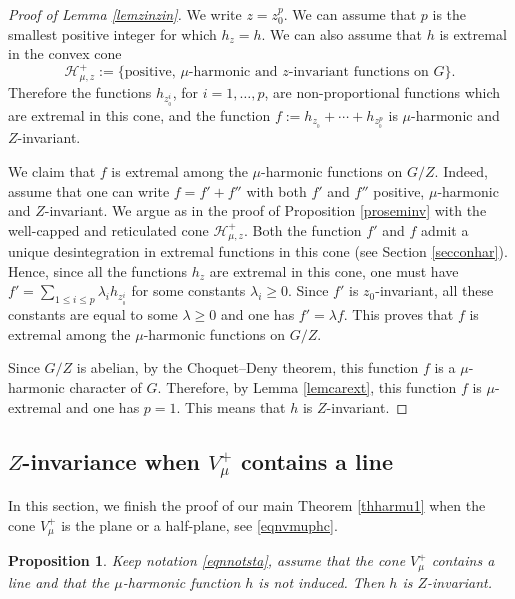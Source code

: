\documentclass[11pt]{article}
\numberwithin{equation}{section}
\let\mathcal\mathscr
\newtheorem{Prop}[Thm]{Proposition}
\theoremstyle{definition}
\newcommand{\mc}[1]{\mathcal{ #1}}
\let\la\lambda
\let\bq\relax
\let\eq\relax
\begin{document}
\begin{proof}[Proof of Lemma \ref{lemzinzin}]
We write $z=z_0^p$. We can assume that $p$
is the smallest positive integer for which $h_z=h$.
We can also assume that $h$ is extremal in the
convex cone
\[
\mc H_{\mu,z}^+:=\{
\text{positive, $\mu$-harmonic and $z$-invariant functions on $G$}\}.
\]
Therefore the functions $h_{z_{_0}^i}$, for $i=1,\ldots, p$,
are non-proportional functions which are extremal
in this cone,
and the function $f:= h_{z_{_0}} +\cdots + h_{z_{_0}^{p}}$ is
$\mu$-harmonic and $Z$-invariant.

We claim that $f$ is extremal
among the $\mu$-harmonic functions on $G/Z$.
Indeed, assume that one can write $f=f'+f''$ with both $f'$ and $f''$
positive, $\mu$-harmonic and $Z$-invariant.
We argue as in the proof of Proposition \ref{proseminv}
with the well-capped and reticulated cone $\mc H_{\mu,z}^+$.
Both the function $f'$ and $f$
admit a unique desintegration in extremal functions in this cone
(see Section \ref{secconhar}).
Hence, since all the functions $h_z$ are extremal in this cone,
one must have $f'=\sum_{1\leq i\leq p} \la_i h_{z_{_0}^i}$
for some constants $\la_i\geq 0$. Since $f'$ is $z_0$-invariant,
all these constants are equal to some $\la\geq 0$ and one has $f'=\la f$.
This proves that $f$ is extremal
among the $\mu$-harmonic functions on $G/Z$.

Since $G/Z$ is abelian, by the Choquet--Deny theorem, this function $f$
is a $\mu$\nobreakdash-har\-monic character of $G$.
Therefore, by Lemma \ref{lemcarext}, this function $f$ is $\mu$-extremal
and one has $p=1$. This means that $h$ is $Z$-invariant.
\end{proof}

\subsection{$Z$-invariance when $V^+_\mu$ contains a line}
\label{secvmulin}

\bq
In this section, we finish the proof of our main Theorem
\ref{thharmu1}
when the cone $V_\mu^+$ is the plane or a half-plane,
see \eqref{eqnvmuphc}.
\eq

\begin{Prop}

\label{provmulin1}
Keep notation \eqref{eqnnotsta}, assume that
the cone $V^+_\mu$ contains a line and
that the $\mu$-harmonic function $h$ is not induced. Then
$h$ is $Z$-invariant.
\end{Prop}
\end{document}
